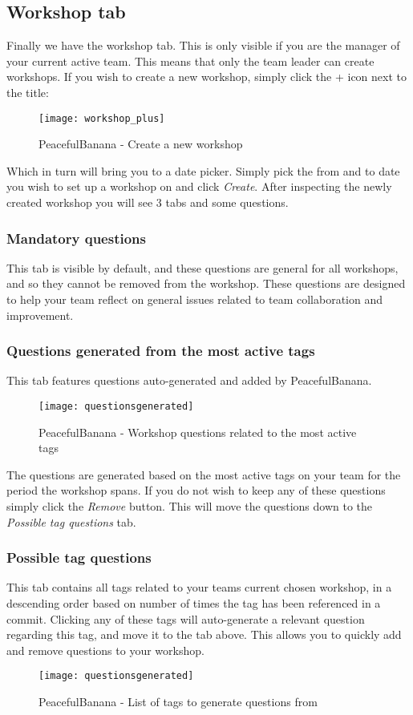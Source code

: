 %
%

\subsection{Workshop tab}
Finally we have the workshop tab. This is only visible if you are the manager of your current active team. This means that only the team leader can create workshops. 
If you wish to create a new workshop, simply click the + icon next to the title: 
\begin{figure}[h!]
\label{workshop_plus}
\centering
	\texttt{[image: workshop\_plus]}
\caption{PeacefulBanana - Create a new workshop}
\end{figure}

Which in turn will bring you to a date picker. Simply pick the from and to date you wish to set up a workshop on and click \textit{Create}.
After inspecting the newly created workshop you will see 3 tabs and some questions. 
\subsubsection*{Mandatory questions}
This tab is visible by default, and these questions are general for all workshops, and so they cannot be removed from the workshop. These questions are designed to help your team reflect on general issues related to team collaboration and improvement. \\
\subsubsection*{Questions generated from the most active tags}
This tab features questions auto-generated and added by PeacefulBanana.
\begin{figure}[h!]
\label{questionsgenerated}
\centering
	\texttt{[image: questionsgenerated]}
\caption{PeacefulBanana - Workshop questions related to the most active tags}
\end{figure}

The questions are generated based on the most active tags on your team for the period the workshop spans. If you do not wish to keep any of these questions simply click the \textit{Remove} button. This will move the questions down to the \textit{Possible tag questions} tab.

\subsubsection*{Possible tag questions}
This tab contains all tags related to your teams current chosen workshop, in a descending order based on number of times the tag has been referenced in a commit. Clicking any of these tags will auto-generate a relevant question regarding this tag, and move it to the tab above. This allows you to quickly add and remove questions to your workshop. 
\begin{figure}[h!]
\label{questionsgenerated}
\centering
	\texttt{[image: questionsgenerated]}
\caption{PeacefulBanana - List of tags to generate questions from}
\end{figure}

